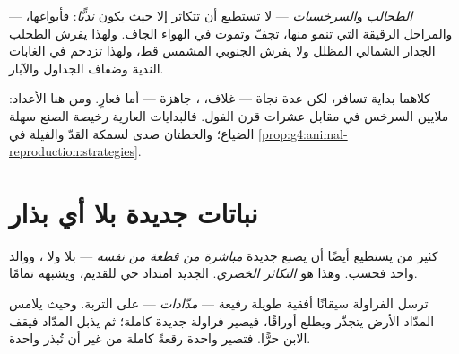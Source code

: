 \begin{proposition}\label{prop:g4:plants-without-seeds:damp}
  --- \emph{الطحالب}
و\emph{السرخسيات} --- لا تستطيع أن تتكاثر إلا حيث
يكون \emph{نديًّا}: فأبواغها، والمراحل الرقيقة التي تنمو منها، تجفّ
وتموت في الهواء الجاف. ولهذا يفرش الطحلب الجدار الشمالي المظلل ولا
يفرش الجنوبي المشمس قط، ولهذا تزدحم  في الغابات الندية
وضفاف الجداول والآبار.
\end{proposition}
\admitted

\begin{remark}\label{rem:g4:plants-without-seeds:sporeseed}
كلاهما بداية تسافر، لكن  عدة نجاة --- غلاف، ،
 جاهزة --- أما  فعارٍ. ومن هنا الأعداد: ملايين 
السرخس في مقابل عشرات  قرن الفول. فالبدايات العارية رخيصة
الصنع سهلة الضياع؛ والخطتان صدى لسمكة القدّ والفيلة في
\cref{prop:g4:animal-reproduction:strategies}.
\end{remark}

\section{نباتات جديدة بلا أي بذار}

\begin{definition}\label{def:g4:plants-without-seeds:vegetative}
كثير من  يستطيع أيضًا أن يصنع  جديدة \emph{مباشرة من
قطعة من نفسه} --- بلا  ولا ، ووالد واحد فحسب. وهذا هو
\emph{التكاثر الخضري}.  الجديد امتداد حي
للقديم، ويشبهه تمامًا.
\end{definition}

\begin{example}\label{ex:g4:plants-without-seeds:runner}
ترسل  الفراولة سيقانًا أفقية طويلة رفيعة ---
\emph{مدّادات} --- على التربة. وحيث يلامس المدّاد
الأرض يتجذّر ويطلع أوراقًا، فيصير  فراولة جديدة كاملة؛ ثم يذبل
المدّاد فيقف الابن حرًّا. فتصير  واحدة رقعةً كاملة من غير أن
تُبذر  واحدة.
\end{example}

